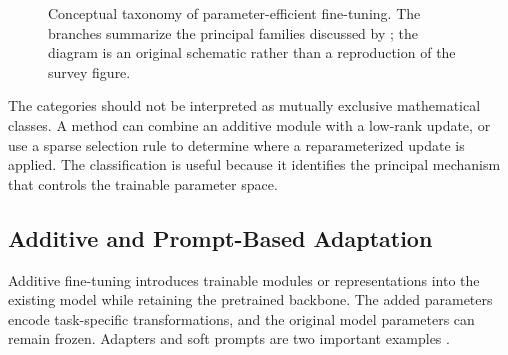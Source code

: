 \begin{figure}[htbp]
    \centering
    
    \caption{Conceptual taxonomy of parameter-efficient fine-tuning. The
    branches summarize the principal families discussed by
    \textcite{prottasha2025peft}; the diagram is an original schematic rather
    than a reproduction of the survey figure.}
    \label{fig:peft-taxonomy}
\end{figure}

The categories should not be interpreted as mutually exclusive mathematical
classes. A method can combine an additive module with a low-rank update, or
use a sparse selection rule to determine where a reparameterized update is
applied. The classification is useful because it identifies the principal
mechanism that controls the trainable parameter space.

\subsection{Additive and Prompt-Based Adaptation}
\label{subsec:peft-additive-prompts}

Additive fine-tuning introduces trainable modules or representations into
the existing model while retaining the pretrained backbone. The added
parameters encode task-specific transformations, and the original model
parameters can remain frozen. Adapters and soft prompts are two important
examples \parencite{prottasha2025peft}.


